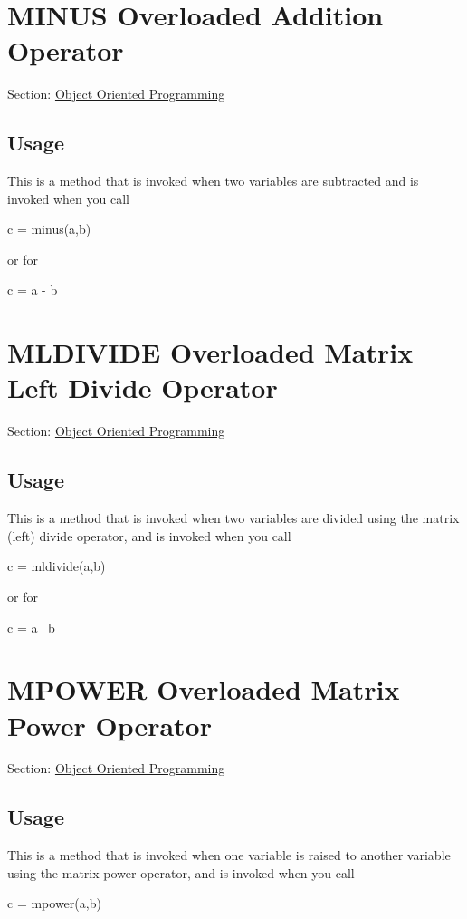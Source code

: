  \hypertarget{class_minus}{}\section{M\-I\-N\-U\-S Overloaded Addition Operator}\label{class_minus}
Section\-: \hyperlink{sec_class}{Object Oriented Programming} \hypertarget{vtkwidgets_vtkxyplotwidget_Usage}{}\subsection{Usage}\label{vtkwidgets_vtkxyplotwidget_Usage}
This is a method that is invoked when two variables are subtracted and is invoked when you call \begin{DoxyVerb}   c = minus(a,b)
\end{DoxyVerb}
 or for \begin{DoxyVerb}   c = a - b
\end{DoxyVerb}
 \hypertarget{class_mldivide}{}\section{M\-L\-D\-I\-V\-I\-D\-E Overloaded Matrix Left Divide Operator}\label{class_mldivide}
Section\-: \hyperlink{sec_class}{Object Oriented Programming} \hypertarget{vtkwidgets_vtkxyplotwidget_Usage}{}\subsection{Usage}\label{vtkwidgets_vtkxyplotwidget_Usage}
This is a method that is invoked when two variables are divided using the matrix (left) divide operator, and is invoked when you call \begin{DoxyVerb}   c = mldivide(a,b)
\end{DoxyVerb}
 or for \begin{DoxyVerb}   c = a \ b
\end{DoxyVerb}
 \hypertarget{class_mpower}{}\section{M\-P\-O\-W\-E\-R Overloaded Matrix Power Operator}\label{class_mpower}
Section\-: \hyperlink{sec_class}{Object Oriented Programming} \hypertarget{vtkwidgets_vtkxyplotwidget_Usage}{}\subsection{Usage}\label{vtkwidgets_vtkxyplotwidget_Usage}
This is a method that is invoked when one variable is raised to another variable using the matrix power operator, and is invoked when you call \begin{DoxyVerb}  c = mpower(a,b)
\end{DoxyVerb}

